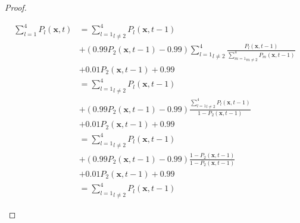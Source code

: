 \documentclass[\main/thesis.tex]{subfiles}
\begin{document}
\begin{proof}
\begin{itemize}
\begin{itemize}
\begin{itemize}
                             	                     \begin{align*}
                             	                       \sum_{l{=}1}^4 P_l(\boldsymbol{x}, t) 
                             	                       &{=} \underset{l {\ne} 2}{\sum_{l{=}1}^4} P_l(\boldsymbol{x}, t{-}1)\\
                             	                       &{+} (0.99 P_2(\boldsymbol{x}, t{-}1) {-} 0.99)
                             	                            \underset{l {\ne} 2}{\sum_{l{=}1}^4}
                             	                                      \frac{P_l(\boldsymbol{x}, t{-}1)}
                             	                                           {\underset{m {\ne} 2}{\sum_{m{=}1}^4} 
                             		                                        P_m(\boldsymbol{x}, t{-}1)}\\
                             	                       &{+} 0.01 P_2(\boldsymbol{x}, t{-}1) {+} 0.99 \\
                                   	                   &{=} \underset{l {\ne} 2}{\sum_{l{=}1}^4} P_l(\boldsymbol{x}, t{-}1)\\
                             	                       &{+} (0.99 P_2(\boldsymbol{x}, t{-}1) {-} 0.99)
                                            	            \frac{\underset{l {\ne} 2}{\sum_{l{=}1}^4}
                             		                              P_l(\boldsymbol{x}, t{-}1)}
                             	                                 {1 {-} P_2(\boldsymbol{x}, t{-}1)} \\
                             	                       &{+} 0.01 P_2(\boldsymbol{x}, t{-}1) {+} 0.99 \\
                             	                       &{=} \underset{l {\ne} 2}{\sum_{l{=}1}^4} P_l(\boldsymbol{x}, t{-}1)\\
                             	                       &{+} (0.99 P_2(\boldsymbol{x}, t{-}1) {-} 0.99)
                             	                            \frac{1 {-} P_2(\boldsymbol{x}, t{-}1)}
                             	                                 {1 {-} P_2(\boldsymbol{x}, t{-}1)} \\
                                     	               &{+} 0.01 P_2(\boldsymbol{x}, t{-}1) {+} 0.99 \\
                             	                       &{=} \underset{l {\ne} 2}{\sum_{l{=}1}^4}  
                             	                              P_l(\boldsymbol{x}, t{-}1)

\end{align*}
\end{itemize}
\end{itemize}
\end{itemize}
\end{proof}
\end{document}
